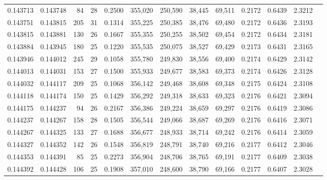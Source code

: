 \begin{tabular}{rrrrrrrrrrrrr}
0.143713 & 0.143748 &  84 &  28 &                                     0.2500 & 355,020 & 250,590 &  38,445 &  69,511 & 0.2172 & 0.6439 & 2.3212 \\
0.143751 & 0.143815 & 205 &  31 &                                     0.1314 & 355,225 & 250,385 &  38,476 &  69,480 & 0.2172 & 0.6436 & 2.3193 \\
0.143815 & 0.143881 & 130 &  26 &                                     0.1667 & 355,355 & 250,255 &  38,502 &  69,454 & 0.2172 & 0.6434 & 2.3181 \\
0.143884 & 0.143945 & 180 &  25 &                                     0.1220 & 355,535 & 250,075 &  38,527 &  69,429 & 0.2173 & 0.6431 & 2.3165 \\
0.143946 & 0.144012 & 245 &  29 &                                     0.1058 & 355,780 & 249,830 &  38,556 &  69,400 & 0.2174 & 0.6429 & 2.3142 \\
0.144013 & 0.144031 & 153 &  27 &                                     0.1500 & 355,933 & 249,677 &  38,583 &  69,373 & 0.2174 & 0.6426 & 2.3128 \\
0.144032 & 0.144117 & 209 &  25 &                                     0.1068 & 356,142 & 249,468 &  38,608 &  69,348 & 0.2175 & 0.6424 & 2.3108 \\
0.144118 & 0.144174 & 150 &  25 &                                     0.1429 & 356,292 & 249,318 &  38,633 &  69,323 & 0.2176 & 0.6421 & 2.3094 \\
0.144175 & 0.144237 &  94 &  26 &                                     0.2167 & 356,386 & 249,224 &  38,659 &  69,297 & 0.2176 & 0.6419 & 2.3086 \\
0.144237 & 0.144267 & 158 &  28 &                                     0.1505 & 356,544 & 249,066 &  38,687 &  69,269 & 0.2176 & 0.6416 & 2.3071 \\
0.144267 & 0.144325 & 133 &  27 &                                     0.1688 & 356,677 & 248,933 &  38,714 &  69,242 & 0.2176 & 0.6414 & 2.3059 \\
0.144327 & 0.144352 & 142 &  26 &                                     0.1548 & 356,819 & 248,791 &  38,740 &  69,216 & 0.2177 & 0.6412 & 2.3046 \\
0.144353 & 0.144391 &  85 &  25 &                                     0.2273 & 356,904 & 248,706 &  38,765 &  69,191 & 0.2177 & 0.6409 & 2.3038 \\
0.144392 & 0.144428 & 106 &  25 &                                     0.1908 & 357,010 & 248,600 &  38,790 &  69,166 & 0.2177 & 0.6407 & 2.3028 \\

\end{tabular}
